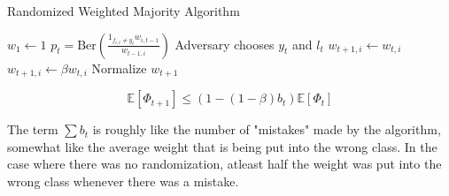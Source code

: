 \begin{algorithm}[H]
    \caption{Randomized Weighted Majority Algorithm}
        \begin{algorithmic}
                \State $w_1 \gets 1$
                \Statex
                    \State $p_t  = \text{Ber}(\frac{1_{f_{i, t} \neq y_t} w_{i, t-1}}{w_{t-1, i}})$ 
                    \Statex
                    \State Adversary chooses $y_t$ and $l_t$
                        \State $w_{t+1,i} \gets w_{t,i}$
                    \Else
                        \State $w_{t+1,i} \gets \beta w_{t,i}$ 
                    \EndIf
                    \State Normalize $w_{t+1}$
                \EndFor
        \end{algorithmic}
\end{algorithm}

\begin{equation}
    \label{Randomized}
    \mathbb{E}[\Phi_{t+1}] \le (1 - (1 - \beta)b_t) \mathbb{E}[\Phi_t]
\end{equation}


The term 
$\sum b_t$ is roughly like  the number of "mistakes" made by the algorithm, somewhat like the average weight that
is being put into the wrong class. In the case where there was no randomization, atleast half the weight was put into the wrong class whenever there was a mistake.


